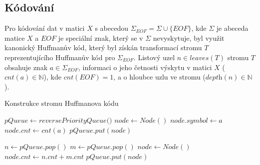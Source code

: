 \documentclass[a4paper, 11pt, fleqn]{scrartcl}
\begin{document}
      \subsection{Kódování}
        Pro kódování dat v matici $X$ s abecedou $\Sigma_{EOF} = \Sigma \cup \{\textit{EOF}\}$, kde $\Sigma$ je abeceda matice $X$ a $\textit{EOF}$ je speciální znak, který se v $\Sigma$ nevyskytuje, byl využit kanonický Huffmanův kód, který byl získán transformací stromu $T$ reprezentujícího Huffmanův kód pro $\Sigma_{EOF}$. Listový uzel $n \in leaves(T)$ stromu $T$ obsahuje znak $a \in \Sigma_{EOF}$, informaci o jeho četnosti výskytu v matici $X$ ($cnt(a) \in \mathbb{N}$), kde $cnt(\textit{EOF}) = 1$, a o hloubce uzlu ve stromu ($\textit{depth}(n) \in \mathbb{N}$).

        \begin{algorithm}[!h]
          \SetAlgoLined
          \DontPrintSemicolon
          \caption{Konstrukce stromu Huffmanova kódu}

          \vspace*{2mm}

          $pQueue \leftarrow \textit{reversePriorityQueue()}$ 
          {
            $node \leftarrow Node()$
            $node.symbol \leftarrow a$\;
            $node.cnt \leftarrow cnt(a)$\;
            $pQueue.put(node)$\;
          }

          \vspace*{1mm}

          {
            $n \leftarrow pQueue.pop()$\;
            $m \leftarrow pQueue.pop()$\;
            $node \leftarrow Node()$
            $node.cnt \leftarrow n.cnt + m.cnt$\;
            $pQueue.put(node)$\;
          }


        \end{algorithm}

        \newpage
\end{document}
